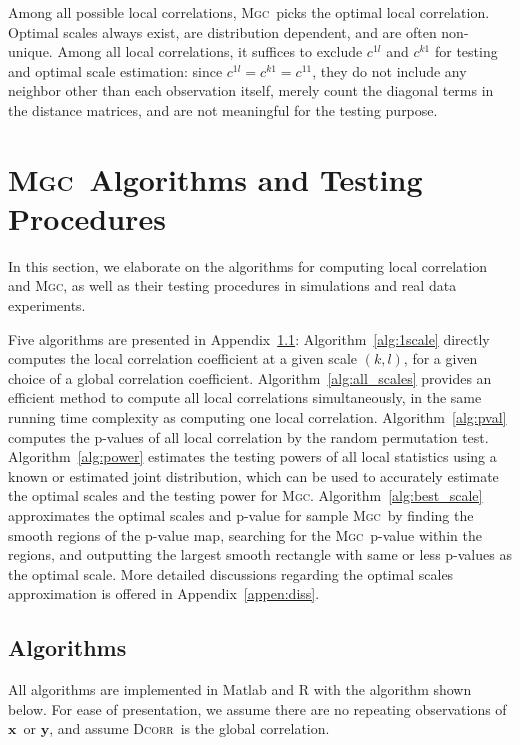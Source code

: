 \documentclass[11pt]{article}
\providecommand{\sct}[1]{{\normalfont\textsc{#1}}}
\providecommand{\mb}[1]{\boldsymbol{#1}}
\newcommand{\G}{c}
\newcommand{\Mgc}{\sct{Mgc}}
\newcommand{\Dcorr}{\sct{Dcorr}}
\newcommand{\mbx}{\ensuremath{\mb{x}}}
\newcommand{\mby}{\ensuremath{\mb{y}}}
\begin{document}
Among all possible local correlations, \Mgc~picks the optimal local correlation. Optimal scales always exist,  are distribution dependent, and are often non-unique. Among all local correlations, it suffices to exclude $\G^{1l}$ and $\G^{k1}$ for testing and optimal scale estimation: since $\G^{1l}=\G^{k1}=\G^{11}$, they do not include any neighbor other than each observation itself, merely count the diagonal terms in the distance matrices, and are not meaningful for the testing purpose.


\section{\Mgc~Algorithms and Testing Procedures}
\label{appen:tests}
In this section, we elaborate on the algorithms for computing local correlation and \Mgc, as well as their testing procedures in simulations and real data experiments.

Five algorithms are presented in Appendix~\ref{appen:algorithms}: Algorithm~\ref{alg:1scale} directly computes the local correlation coefficient at a given scale $(k,l)$, for a given choice of a global correlation coefficient.
Algorithm~\ref{alg:all_scales} provides an efficient method to compute all local correlations simultaneously, in the same running time complexity as computing one local correlation. Algorithm~\ref{alg:pval} computes the p-values of all local correlation by the random permutation test. 
Algorithm~\ref{alg:power} estimates the testing powers of all local statistics using a known or estimated joint distribution, which can be used to accurately estimate the optimal scales and the testing power for \Mgc. 
Algorithm~\ref{alg:best_scale} approximates the optimal scales and p-value for sample \Mgc~by finding the smooth regions of the p-value map, searching for the \Mgc~p-value within the regions, and outputting the largest smooth rectangle with same or less p-values as the optimal scale. More detailed discussions regarding the optimal scales approximation is offered in Appendix~\ref{appen:diss}.

\subsection{Algorithms}
\label{appen:algorithms}
All algorithms are implemented in Matlab and R with the algorithm shown below. For ease of presentation, we assume there are no repeating observations of \mbx~or \mby, and assume \Dcorr~is the global correlation.
\end{document}
